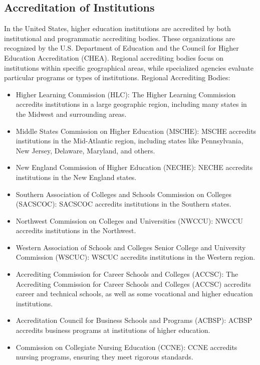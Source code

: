 \subsection{Accreditation of Institutions}

In the United States, higher education institutions are accredited by both institutional and programmatic accrediting bodies. These organizations are recognized by the U.S. Department of Education and the Council for Higher Education Accreditation (CHEA). Regional accrediting bodies focus on institutions within specific geographical areas, while specialized agencies evaluate particular programs or types of institutions. 
Regional Accrediting Bodies:

\begin{itemize}
    \item Higher Learning Commission (HLC): The Higher Learning Commission accredits institutions in a large geographic region, including many states in the Midwest and surrounding areas.
    \item Middle States Commission on Higher Education (MSCHE): MSCHE accredits institutions in the Mid-Atlantic region, including states like Pennsylvania, New Jersey, Delaware, Maryland, and others. 
    \item New England Commission of Higher Education (NECHE): NECHE accredits institutions in the New England states. 
    \item Southern Association of Colleges and Schools Commission on Colleges (SACSCOC): SACSCOC accredits institutions in the Southern states.
    \item Northwest Commission on Colleges and Universities (NWCCU): NWCCU accredits institutions in the Northwest.
    \item Western Association of Schools and Colleges Senior College and University Commission (WSCUC): WSCUC accredits institutions in the Western region. 
    \item Accrediting Commission for Career Schools and Colleges (ACCSC): The Accrediting Commission for Career Schools and Colleges (ACCSC) accredits career and technical schools, as well as some vocational and higher education institutions. 
    \item Accreditation Council for Business Schools and Programs (ACBSP): ACBSP accredits business programs at institutions of higher education.
    \item Commission on Collegiate Nursing Education (CCNE): CCNE accredits nursing programs, ensuring they meet rigorous standards. 

\end{itemize}
